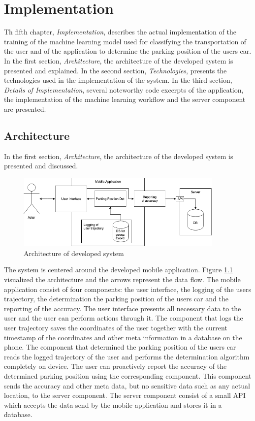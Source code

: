 \chapter{Implementation}
Th fifth chapter, \textit{Implementation}, describes the actual implementation of the training of the machine learning model used for classifying the transportation of the user and of the application to determine the parking position of the users car. 
In the first section, \textit{Architecture}, the architecture of the developed system is presented and explained.
In the second section, \textit{Technologies}, presents the technologies used in the implementation of the system.
In the third section, \textit{Details of Implementation}, several noteworthy code excerpts of the application, the implementation of the machine learning workflow and the server component are presented.

\section{Architecture}
In the first section, \textit{Architecture}, the architecture of the developed system is presented and discussed.


\begin{figure}[h]
    \centering
    \includegraphics[width=0.9\textwidth]{images/architecture.png}
    \caption{Architecture of developed system}
    \label{fig:architecture}
\end{figure}


The system is centered around the developed mobile application. Figure \ref{fig:architecture} visualized the architecture and the arrows represent the data flow.  The mobile application consist of four components: the user interface, the logging of  the users trajectory, the determination the parking position of the users car and the reporting of the accuracy. The user interface presents all necessary data to the user and the user can perform actions through it. The component that logs the user trajectory saves the coordinates of the user together with the current timestamp of the coordinates and other meta information in a database on the phone. The component that determined the parking position of the users car reads the logged trajectory of the user and performs the determination algorithm completely on device. The user can proactively report the accuracy of the determined parking position using the corresponding component. This component sends the accuracy and other meta data, but no sensitive data such as any actual location, to the server component. The server component consist of a small API which accepts the data send by the mobile application and stores it in a database.

